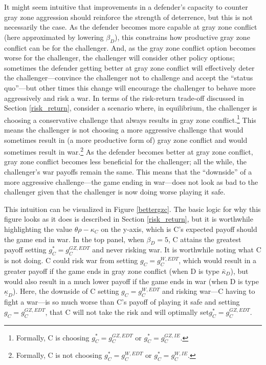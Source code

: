 \documentclass[11pt,letterpaper,pdftex,dvipsnames,table]{article}
\begin{document}
It might seem intuitive that improvements in a defender's capacity to counter gray zone aggression should reinforce the strength of deterrence, but this is not necessarily the case. As the defender becomes more capable at gray zone conflict (here approximated by lowering $\beta_{D}$), this constrains how productive gray zone conflict can be for the challenger. And, as the gray zone conflict option becomes worse for the challenger, the challenger will consider other policy options; sometimes the defender getting better at gray zone conflict will effectively deter the challenger---convince the challenger not to challenge and accept the ``status quo''---but other times this change will encourage the challenger to behave more aggressively and risk a war. In terms of the risk-return trade-off discussed in Section \ref{risk_return}, consider a scenario where, in equilibrium, the challenger is choosing a conservative challenge that always results in gray zone conflict.\footnote{Formally, C is choosing $g_{C}^{*}=g_{C}^{GZ,EDT}$ or $g_{C}^{*}=g_{C}^{GZ,IE}$.} This means the challenger is not choosing a more aggressive challenge that would sometimes result in (a more productive form of) gray zone conflict and would sometimes result in war.\footnote{Formally, C is not choosing $g_{C}^{*}=g_{C}^{W,EDT}$ or $g_{C}^{*}=g_{C}^{W,IE}$.} As the defender becomes better at gray zone conflict, gray zone conflict becomes less beneficial for the challenger; all the while, the challenger's war payoffs remain the same. This means that the ``downside'' of a more aggressive challenge---the game ending in war---does not look as bad to the challenger given that the challenger is now doing worse playing it safe.

This intuition can be visualized in Figure \ref{bettergzc}. The basic logic for why this figure looks as it does is described in Section \ref{risk_return}, but it is worthwhile highlighting the value $\theta\rho-\kappa_C$ on the y-axis, which is C's expected payoff should the game end in war. In the top panel, when $\beta_{D}=5$, C attains the greatest payoff setting $g_{C}^{*}=g_{C}^{GZ,EDT}$ and never risking war. It is worthwhile noting what C is not doing. C could risk war from setting $g_{C}=g_{C}^{W,EDT}$, which would result in a greater payoff if the game ends in gray zone conflict (when D is type $\bar{\kappa}_{D}$), but would also result in a much lower payoff if the game ends in war (when D is type $\underline{\kappa}_{D}$). Here, the downside of C setting $g_{C}=g_{C}^{W,EDT}$ and risking war---C having to fight a war---is so much worse than C's payoff of playing it safe and setting $g_{C}=g_{C}^{GZ,EDT}$, that C will not take the risk and will optimally set$g_{C}^{*}=g_{C}^{GZ,EDT}$.
\end{document}
